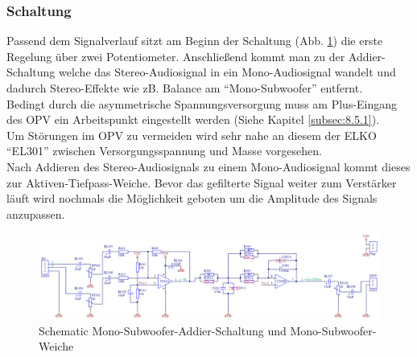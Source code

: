\subsubsection{Schaltung}\label{subsec:5.5.2}
Passend dem Signalverlauf sitzt am Beginn der Schaltung (Abb. \ref{fig:5.5.2.1}) die erste Regelung über zwei Potentiometer.
Anschließend kommt man zu der Addier-Schaltung welche das Stereo-Audiosignal in ein Mono-Audiosignal wandelt und dadurch Stereo-Effekte wie zB. Balance am \enquote{Mono-Subwoofer} entfernt.\\
Bedingt durch die asymmetrische Spannungsversorgung muss am Plus-Eingang des OPV ein Arbeitspunkt eingestellt werden (Siehe Kapitel \ref{subsec:8.5.1}).\\
Um Störungen im OPV zu vermeiden wird sehr nahe an diesem der ELKO \enquote{EL301} zwischen Versorgungsspannung und Masse vorgesehen.\\
Nach Addieren des Stereo-Audiosignals zu einem Mono-Audiosignal kommt dieses zur Aktiven-Tiefpass-Weiche.
Bevor das gefilterte Signal weiter zum Verstärker läuft wird nochmals die Möglichkeit geboten um die Amplitude des Signals anzupassen.
\begin{landscape}
	\vspace*{\fill}
	\begin{figure} [H]
		\centering
		\includegraphics[width=\linewidth,height=0.9\textheight,keepaspectratio]{img/Print3/3mTTWeicheruAddiererDiplSchematic.PNG}
		\caption{Schematic Mono-Subwoofer-Addier-Schaltung und Mono-Subwoofer-Weiche}
		\label {fig:5.5.2.1}
	\end{figure}
	\vfill
\end{landscape}
\raggedbottom


